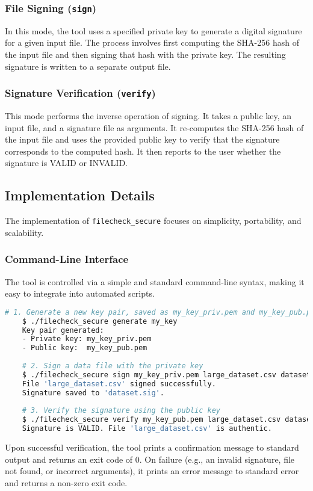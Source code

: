 \documentclass[12pt, letterpaper]{article}
\begin{document}
\subsubsection{File Signing (\texttt{sign})}
In this mode, the tool uses a specified private key to generate a digital signature for a given input file. The process involves first computing the SHA-256 hash of the input file and then signing that hash with the private key. The resulting signature is written to a separate output file.

\subsubsection{Signature Verification (\texttt{verify})}
This mode performs the inverse operation of signing. It takes a public key, an input file, and a signature file as arguments. It re-computes the SHA-256 hash of the input file and uses the provided public key to verify that the signature corresponds to the computed hash. It then reports to the user whether the signature is VALID or INVALID.

\subsection{Implementation Details}
The implementation of \texttt{filecheck\_secure} focuses on simplicity, portability, and scalability.

\subsubsection{Command-Line Interface}
The tool is controlled via a simple and standard command-line syntax, making it easy to integrate into automated scripts.
\begin{lstlisting}[language=bash, caption={Command-line usage for filecheck\_secure.}]
	# 1. Generate a new key pair, saved as my_key_priv.pem and my_key_pub.pem
	$ ./filecheck_secure generate my_key
	Key pair generated:
	- Private key: my_key_priv.pem
	- Public key:  my_key_pub.pem
	
	# 2. Sign a data file with the private key
	$ ./filecheck_secure sign my_key_priv.pem large_dataset.csv dataset.sig
	File 'large_dataset.csv' signed successfully.
	Signature saved to 'dataset.sig'.
	
	# 3. Verify the signature using the public key
	$ ./filecheck_secure verify my_key_pub.pem large_dataset.csv dataset.sig
	Signature is VALID. File 'large_dataset.csv' is authentic.
\end{lstlisting}
Upon successful verification, the tool prints a confirmation message to standard output and returns an exit code of 0. On failure (e.g., an invalid signature, file not found, or incorrect arguments), it prints an error message to standard error and returns a non-zero exit code.
\end{document}
